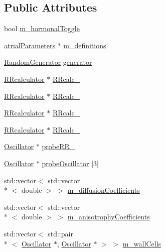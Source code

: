 \subsection*{Public Attributes}
\begin{DoxyCompactItemize}
\item 
bool \hyperlink{class_atrial_machine2d_a784a6fb0c363c6858e992957279a28ea}{m\+\_\+hormonal\+Toggle}
\item 
\hyperlink{classatrial_parameters}{atrial\+Parameters} $\ast$ \hyperlink{class_atrial_machine2d_aeafb998f5621fb19749014161d7d600d}{m\+\_\+definitions}
\item 
\hyperlink{class_random_generator}{Random\+Generator} \hyperlink{class_atrial_machine2d_a4ee41f8430aca76d5c6411cd37c92d38}{generator}
\item 
\hyperlink{class_r_rcalculator}{R\+Rcalculator} $\ast$ \hyperlink{class_atrial_machine2d_ace665fff3f0583d9d1e285f4775adfa6}{R\+Rcalc\+\_}
\item 
\hyperlink{class_r_rcalculator}{R\+Rcalculator} $\ast$ \hyperlink{class_atrial_machine2d_a34b1581457faa0fec1579cf51a187598}{R\+Rcalc\+\_}
\item 
\hyperlink{class_r_rcalculator}{R\+Rcalculator} $\ast$ \hyperlink{class_atrial_machine2d_a0bcbe6368dd8bb0eb66efaafc5a4dbfb}{R\+Rcalc\+\_}
\item 
\hyperlink{class_r_rcalculator}{R\+Rcalculator} $\ast$ \hyperlink{class_atrial_machine2d_aa2ede01ca50864789c112cca567c1444}{R\+Rcalc\+\_}
\item 
\hyperlink{class_oscillator}{Oscillator} $\ast$ \hyperlink{class_atrial_machine2d_ae73cbdaac9845bd587afefab6c8c94fa}{probe\+R\+R\+\_}
\item 
\hyperlink{class_oscillator}{Oscillator} $\ast$ \hyperlink{class_atrial_machine2d_acd87b83232be904156b1a8ba3f1ee244}{probe\+Oscillator} \mbox{[}3\mbox{]}
\item 
std\+::vector$<$ std\+::vector\\*
$<$ double $>$ $>$ \hyperlink{class_atrial_machine2d_a13e43c0cfd52339dac5ac7ed5a88a88a}{m\+\_\+diffusion\+Coefficients}
\item 
std\+::vector$<$ std\+::vector\\*
$<$ double $>$ $>$ \hyperlink{class_atrial_machine2d_abd24f8eb85fef1ffa94d910e1a87dda8}{m\+\_\+anisotrophy\+Coefficients}
\item 
std\+::vector$<$ std\+::pair\\*
$<$ \hyperlink{class_oscillator}{Oscillator} $\ast$, \hyperlink{class_oscillator}{Oscillator} $\ast$ $>$ $>$ \hyperlink{class_atrial_machine2d_aea2f8cb631c24f1dbec8859d50a7918f}{m\+\_\+wall\+Cells}

\end{DoxyCompactItemize}
